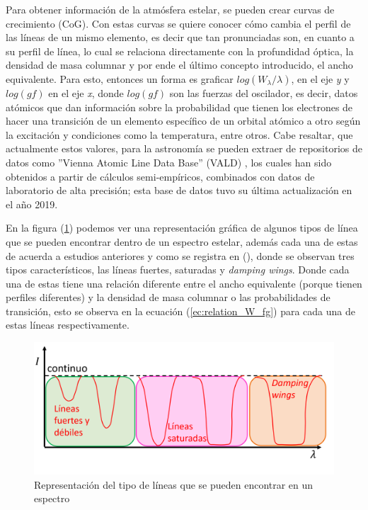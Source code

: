 \documentclass[12pt,oneside,openany,letter]{book}
\begin{document}
\noindent Para obtener información de la atmósfera estelar, se pueden crear curvas de crecimiento (CoG). Con estas curvas se quiere conocer cómo cambia el perfil de las líneas de un mismo elemento, es decir que tan pronunciadas son, en cuanto a su perfil de línea, lo cual se relaciona directamente con la profundidad óptica, la densidad de masa columnar y por ende el último concepto introducido, el ancho equivalente. Para esto, entonces un forma es graficar $log(W_{\lambda}/\lambda)$, en el eje \textit{y} y $log(gf)$ en el eje \textit{x}, donde $log(gf)$ son las fuerzas del oscilador, es decir, datos atómicos que dan información sobre la probabilidad que tienen los electrones de hacer una transición de un elemento específico de un orbital atómico a otro según la excitación y condiciones como la temperatura, entre otros. Cabe resaltar, que actualmente estos valores, para la astronomía se pueden extraer de repositorios de datos como ''Vienna Atomic Line Data Base'' (VALD) \citep{piskunov1995vald}, los cuales han sido obtenidos a partir de cálculos semi-empíricos, combinados con datos de laboratorio de alta precisión; esta base de datos tuvo su última actualización en el año 2019.

En la figura (\ref{fig:lines_cog}) podemos ver una representación gráfica de algunos tipos de línea que se pueden encontrar dentro de un espectro estelar, además cada una de estas de acuerda a estudios anteriores y como se registra en (\cite{carroll2017introduction}), donde se observan tres tipos característicos, las líneas fuertes, saturadas y \textit{damping wings}. Donde cada una de estas tiene una relación diferente entre el ancho equivalente (porque tienen perfiles diferentes) y la densidad de masa columnar o las probabilidades de transición, esto se observa en la ecuación (\ref{ec:relation_W_fg}) para cada una de estas líneas respectivamente.

\begin{figure}[h]
    \centering
    \includegraphics[width=0.8\linewidth]{Images/lineas_goc.png}
    \caption{Representación del tipo de líneas que se pueden encontrar en un espectro}
    \label{fig:lines_cog}
\end{figure}
\end{document}
